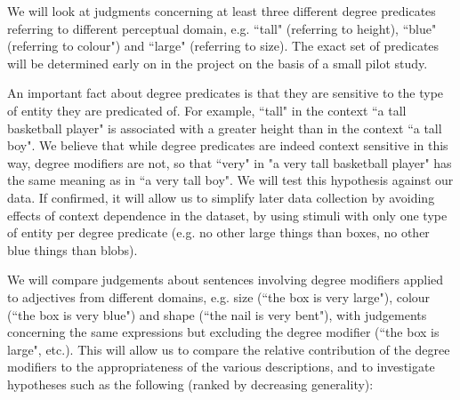 \documentclass[11pt,a4paper]{article}
\newcommand{\comment}[1]{{\footnotesize\textsc{#1}}}
\begin{document}
We will look at judgments concerning at least three different degree predicates referring to different perceptual domain, e.g. ``tall" (referring to height), ``blue" (referring to colour") and ``large" (referring to size). The exact set of predicates will be determined early on in the project on the basis  of a small pilot study.





An important fact about degree predicates is that they are sensitive to the type of entity they are predicated of. For example, ``tall" in the context ``a tall basketball player" is associated with a greater height than in the context ``a tall boy". We believe that while degree predicates are indeed context sensitive in this way, degree modifiers are not, so that ``very" in "a very tall basketball player" has the same meaning as in ``a very tall boy". We will test this hypothesis against our data. If confirmed, it will allow us to simplify later data collection by avoiding effects of context dependence in the dataset, by using stimuli with only one type of entity per degree predicate (e.g. no other large things than boxes, no other blue things than blobs).


We will compare judgements about sentences involving degree modifiers applied to adjectives from different domains, e.g. size (``the box is very large"), colour (``the box is very blue") and shape (``the nail is very bent"), with judgements concerning the same expressions but excluding the degree modifier (``the box is large", etc.). This will allow us to compare the relative contribution of the degree modifiers to the appropriateness of the various descriptions, and to investigate  hypotheses such as the following (ranked by decreasing generality):
\end{document}
